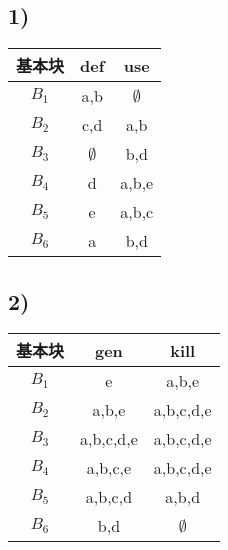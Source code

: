 \documentclass[11pt]{article}
\begin{document}
\subsection*{1)}
\begin{table}[H]
\centering
\begin{tabular}{|c|c|c|}
	\hline
	\textbf{基本块} & \textbf{def} & \textbf{use} \\ \hline
	$B_1$ & a,b & $\emptyset$ \\ \hline
	$B_2$ & c,d & a,b \\ \hline
	$B_3$ & $\emptyset$ & b,d \\ \hline
	$B_4$ & d & a,b,e \\ \hline
	$B_5$ & e & a,b,c \\ \hline
	$B_6$ & a & b,d \\ \hline
\end{tabular}
\end{table}
\subsection*{2)}
\begin{table}[H]
\centering
\begin{tabular}{|c|c|c|}
	\hline
	\textbf{基本块} & \textbf{gen} & \textbf{kill} \\ \hline
	$B_1$ & e & a,b,e \\ \hline
	$B_2$ & a,b,e & a,b,c,d,e \\ \hline
	$B_3$ & a,b,c,d,e & a,b,c,d,e \\ \hline
	$B_4$ & a,b,c,e & a,b,c,d,e \\ \hline
	$B_5$ & a,b,c,d & a,b,d \\ \hline
	$B_6$ & b,d & $\emptyset$ \\ \hline
\end{tabular}
\end{table}
\end{document}
